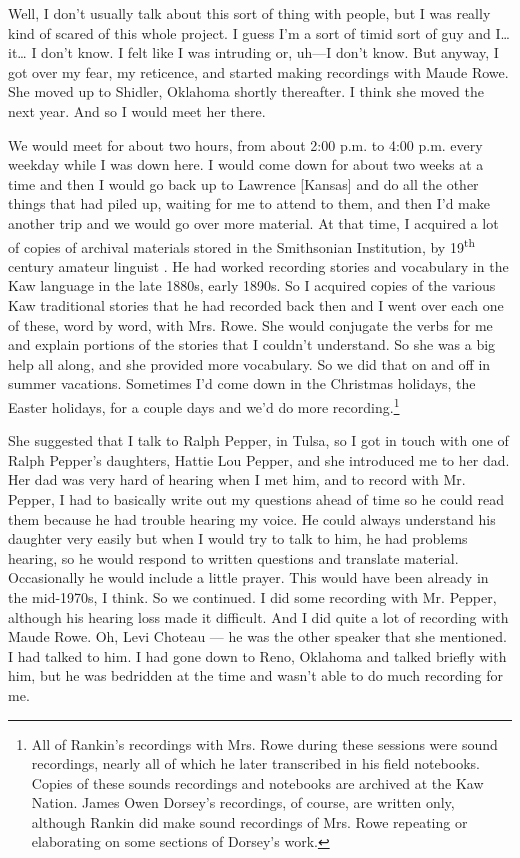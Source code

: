 \documentclass[output=paper]{LSP/langsci}
\begin{document}
Well, I don't usually talk about this sort of thing with people, but I was really kind of scared of this whole project. I guess I'm a sort of timid sort of guy and I{\ldots} it{\ldots} I don't know. I felt like I was intruding or, uh---I don't know. But anyway, I got over my fear, my reticence, and started making recordings with Maude Rowe. She moved up to Shidler, Oklahoma shortly thereafter. I think she moved the next year. And so I would meet her there. 

We would meet for about two hours, from about 2:00 p.m. to 4:00 p.m. every weekday while I was down here. I would come down for about two weeks at a time and then I would go back up to Lawrence [Kansas] and do all the other things that had piled up, waiting for me to attend to them, and then I'd make another trip and we would go over more material. At that time, I acquired a lot of copies of archival materials stored in the Smithsonian Institution, by 19\textsuperscript{th} century amateur linguist . He had worked recording stories and vocabulary in the Kaw language in the late 1880s, early 1890s. So I acquired copies of the various Kaw traditional stories that he had recorded back then and I went over each one of these, word by word, with Mrs. Rowe. She would conjugate the verbs for me and explain portions of the stories that I couldn't understand. So she was a big help all along, and she provided more vocabulary. So we did that on and off in summer vacations. Sometimes I'd come down in the Christmas holidays, the Easter holidays, for a couple days and we'd do more recording.\footnote{All of Rankin's recordings with Mrs. Rowe during these sessions were sound recordings, nearly all of which he later transcribed in his field notebooks. Copies of these sounds recordings and notebooks are archived at the Kaw Nation. James Owen Dorsey's recordings, of course, are written only, although Rankin did make sound recordings of Mrs. Rowe repeating or elaborating on some sections of Dorsey's work.}

She suggested that I talk to Ralph Pepper, in Tulsa, so I got in touch with one of Ralph Pepper's daughters, Hattie Lou Pepper, and she introduced me to her dad. Her dad was very hard of hearing when I met him, and to record with Mr. Pepper, I had to basically write out my questions ahead of time so he could read them because he had trouble hearing my voice. He could always understand his daughter very easily but when I would try to talk to him, he had problems hearing, so he would respond to written questions and translate material. Occasionally he would include a little prayer. This would have been already in the mid-1970s, I think. So we continued. I did some recording with Mr. Pepper, although his hearing loss made it difficult. And I did quite a lot of recording with Maude Rowe. Oh, Levi Choteau --- he was the other speaker that she mentioned. I had talked to him. I had gone down to Reno, Oklahoma and talked briefly with him, but he was bedridden at the time and wasn't able to do much recording for me.
\end{document}
